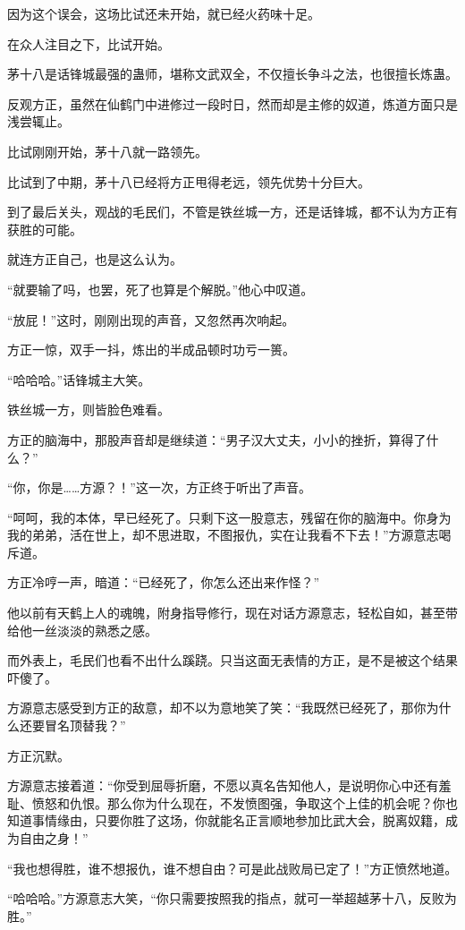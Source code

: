 \begin{this_body}
因为这个误会，这场比试还未开始，就已经火药味十足。

在众人注目之下，比试开始。

茅十八是话锋城最强的蛊师，堪称文武双全，不仅擅长争斗之法，也很擅长炼蛊。

反观方正，虽然在仙鹤门中进修过一段时日，然而却是主修的奴道，炼道方面只是浅尝辄止。

比试刚刚开始，茅十八就一路领先。

比试到了中期，茅十八已经将方正甩得老远，领先优势十分巨大。

到了最后关头，观战的毛民们，不管是铁丝城一方，还是话锋城，都不认为方正有获胜的可能。

就连方正自己，也是这么认为。

“就要输了吗，也罢，死了也算是个解脱。”他心中叹道。

“放屁！”这时，刚刚出现的声音，又忽然再次响起。

方正一惊，双手一抖，炼出的半成品顿时功亏一篑。

“哈哈哈。”话锋城主大笑。

铁丝城一方，则皆脸色难看。

方正的脑海中，那股声音却是继续道：“男子汉大丈夫，小小的挫折，算得了什么？”

“你，你是……方源？！”这一次，方正终于听出了声音。

“呵呵，我的本体，早已经死了。只剩下这一股意志，残留在你的脑海中。你身为我的弟弟，活在世上，却不思进取，不图报仇，实在让我看不下去！”方源意志喝斥道。

方正冷哼一声，暗道：“已经死了，你怎么还出来作怪？”

他以前有天鹤上人的魂魄，附身指导修行，现在对话方源意志，轻松自如，甚至带给他一丝淡淡的熟悉之感。

而外表上，毛民们也看不出什么蹊跷。只当这面无表情的方正，是不是被这个结果吓傻了。

方源意志感受到方正的敌意，却不以为意地笑了笑：“我既然已经死了，那你为什么还要冒名顶替我？”

方正沉默。

方源意志接着道：“你受到屈辱折磨，不愿以真名告知他人，是说明你心中还有羞耻、愤怒和仇恨。那么你为什么现在，不发愤图强，争取这个上佳的机会呢？你也知道事情缘由，只要你胜了这场，你就能名正言顺地参加比武大会，脱离奴籍，成为自由之身！”

“我也想得胜，谁不想报仇，谁不想自由？可是此战败局已定了！”方正愤然地道。

“哈哈哈。”方源意志大笑，“你只需要按照我的指点，就可一举超越茅十八，反败为胜。”


\end{this_body}
